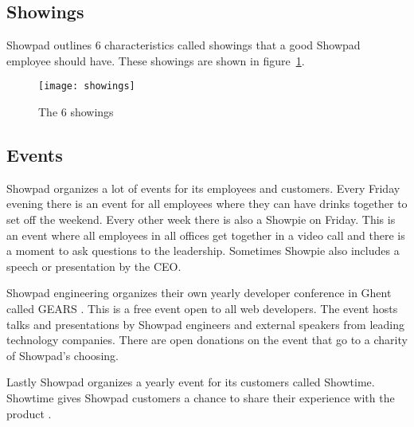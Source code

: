 \subsection{Showings}

Showpad outlines 6 characteristics called showings that a good Showpad employee should have. These showings are shown in figure~\ref{figure:showings}.

\begin{figure}[H]
	\centering
	\texttt{[image: showings]}
	\caption{The 6 showings}
	\label{figure:showings}
\end{figure}

\subsection{Events}

Showpad organizes a lot of events for its employees and customers. Every Friday evening there is an event for all employees where they can have drinks together to set off the weekend. Every other week there is also a Showpie on Friday. This is an event where all employees in all offices get together in a video call and there is a moment to ask questions to the leadership. Sometimes Showpie also includes a speech or presentation by the CEO.

Showpad engineering organizes their own yearly developer conference in Ghent called GEARS \cite{showpad-gears}. This is a free event open to all web developers. The event hosts talks and presentations by Showpad engineers and external speakers from leading technology companies. There are open donations on the event that go to a charity of Showpad's choosing.

Lastly Showpad organizes a yearly event for its customers called Showtime. Showtime gives Showpad customers a chance to share their experience with the product \cite{showpad-showtime}.




